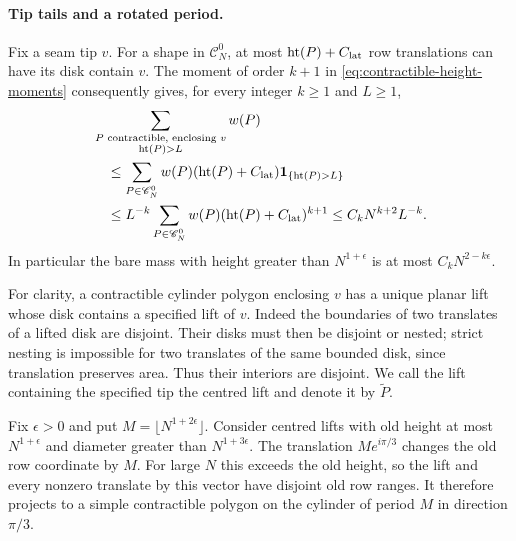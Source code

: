\paragraph{Tip tails and a rotated period.}
Fix a seam tip $v$. For a shape in $\mathscr C_N^0$, at most
$\operatorname{ht}(P)+C_{\rm lat}$ row translations can have its disk
contain $v$. The moment of order $k+1$ in
\eqref{eq:contractible-height-moments} consequently gives, for every
integer $k\ge1$ and $L\ge1$,
\begin{equation}\label{eq:tip-height-tail}
 \begin{aligned}
 &\sum_{\substack{P\text{ contractible, enclosing }v\\
                  \operatorname{ht}(P)>L}}w(P)\\
 &\quad\le \sum_{P\in\mathscr C_N^0}w(P)
      (\operatorname{ht}(P)+C_{\rm lat})
         \mathbf1_{\{\operatorname{ht}(P)>L\}}\\
 &\quad\le L^{-k}\sum_{P\in\mathscr C_N^0}w(P)
              (\operatorname{ht}(P)+C_{\rm lat})^{k+1}
 \le C_kN^{k+2}L^{-k}.
 \end{aligned}
\end{equation}
In particular the bare mass with height greater than $N^{1+\epsilon}$
is at most $C_kN^{2-k\epsilon}$.

For clarity, a contractible cylinder polygon enclosing $v$ has a unique
planar lift whose disk contains a specified lift of $v$. Indeed the
boundaries of two translates of a lifted disk are disjoint. Their disks
must then be disjoint or nested; strict nesting is impossible for two
translates of the same bounded disk, since translation preserves area.
Thus their interiors are disjoint. We call the lift containing the
specified tip the centred lift and denote it by $\widetilde P$.

Fix $\epsilon>0$ and put $M=\lfloor N^{1+2\epsilon}\rfloor$. Consider
centred lifts with old height at most $N^{1+\epsilon}$ and diameter
greater than $N^{1+3\epsilon}$. The translation $M e^{i\pi/3}$ changes
the old row coordinate by $M$. For large $N$ this exceeds the old
height, so the lift and every nonzero translate by this vector have
disjoint old row ranges. It therefore projects to a simple contractible
polygon on the cylinder of period $M$ in direction $\pi/3$.


